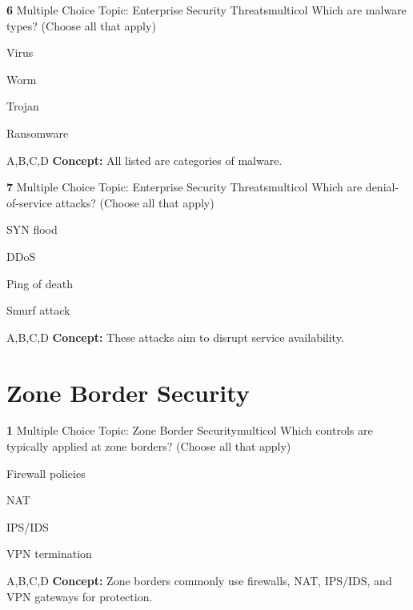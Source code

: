 \documentclass[10pt,a4paper]{article}
\begin{document}
\begin{qcard}{\color{white}\textbf{6} \hfill \small Multiple Choice \textbar{} Topic: Enterprise Security Threats}{multicol}
Which are malware types? (Choose all that apply)

\begin{qoptions}
\item Virus
\item Worm
\item Trojan
\item Ransomware
\end{qoptions}
\begin{explainbox}{A,B,C,D}
\textbf{Concept:} All listed are categories of malware.
\end{explainbox}
\end{qcard}

\begin{qcard}{\color{white}\textbf{7} \hfill \small Multiple Choice \textbar{} Topic: Enterprise Security Threats}{multicol}
Which are denial-of-service attacks? (Choose all that apply)

\begin{qoptions}
\item SYN flood
\item DDoS
\item Ping of death
\item Smurf attack
\end{qoptions}
\begin{explainbox}{A,B,C,D}
\textbf{Concept:} These attacks aim to disrupt service availability.
\end{explainbox}
\end{qcard}

\section{Zone Border Security}
\begin{qcard}{\color{white}\textbf{1} \hfill \small Multiple Choice \textbar{} Topic: Zone Border Security}{multicol}
Which controls are typically applied at zone borders? (Choose all that apply)

\begin{qoptions}
\item Firewall policies
\item NAT
\item IPS/IDS
\item VPN termination
\end{qoptions}
\begin{explainbox}{A,B,C,D}
\textbf{Concept:} Zone borders commonly use firewalls, NAT, IPS/IDS, and VPN gateways for protection.
\end{explainbox}
\end{qcard}
\end{document}
